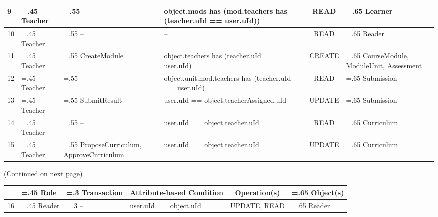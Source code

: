\begin{landscape}
\begin{table}[!ht]
\begin{tabularx}{24cm}{l>{\hsize=.45\hsize}X>{\hsize=.55\hsize}X>{\hsize=0.9\hsize}Xc>{\hsize=.65\hsize}X}
			\midrule
			9  & Teacher                  & --                                            & object.mods has (mod.teachers has (teacher.uId == user.uId))   & READ           & Learner                              \\
			\midrule
			10 & Teacher                  & --                                            & --                                                             & READ           & Reader                               \\
			\midrule
			11 & Teacher                  & CreateModule                                  & object.teachers has \newline(teacher.uId == user.uId)          & CREATE         & CourseModule, ModuleUnit, Assessment \\
			\midrule
			12 & Teacher                  & --                                            & object.unit.mod.teachers has \newline(teacher.uId == user.uId) & READ           & Submission                           \\
			\midrule
			13 & Teacher                  & SubmitResult                                  & user.uId == object.teacherAssigned.uId                         & UPDATE         & Submission                           \\
			\midrule
			14 & Teacher                  & --                                            & user.uId == object.teacher.uId                                 & READ           & Curriculum                           \\
			\midrule
			15 & Teacher                  & ProposeCurriculum, \newline ApproveCurriculum & user.uId == object.teacher.uId                                 & UPDATE         & Curriculum                           \\
			\bottomrule
		\end{tabularx}
	\end{table}
	(Continued on next page)
	\begin{table}
		\begin{tabularx}{24cm}{l>{\hsize=.45\hsize}X>{\hsize=.3\hsize}X>{\hsize=0.9\hsize}Xc>{\hsize=.65\hsize}X}
			   & Role   & Transaction & Attribute-based Condition                                                                   & Operation(s)           & Object(s)                                                                           \\
			\toprule
			16 & Reader & --          & user.uId == object.uId                                                                      & UPDATE, READ           & Reader                                                                              \\

\end{tabularx}
\end{table}
\end{landscape}
